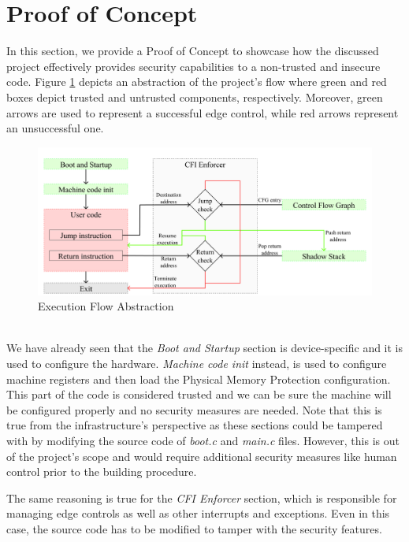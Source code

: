 \section{Proof of Concept}
\label{sec:project_poc}

In this section, we provide a Proof of Concept to showcase how the discussed
project effectively provides security capabilities to a non-trusted and insecure
code. Figure \ref{fig:functioning} depicts an abstraction of the project's flow where
green and red boxes depict trusted and untrusted components, respectively. Moreover,
green arrows are used to represent a successful edge control, while red arrows represent
an unsuccessful one. \\
\begin{figure}[htbp]
  \centering
  \includegraphics[width=.9\linewidth]{images/functioning.png}
  \caption{Execution Flow Abstraction}
  \label{fig:functioning}
\end{figure}
\\

We have already seen that the \textit{Boot and Startup} section is device-specific
and it is used to configure the hardware. \textit{Machine code init} instead, is
used to configure machine registers and then load the Physical Memory Protection
configuration. This part of the code is considered trusted and we can be sure
the machine will be configured properly and no security measures are needed. Note
that this is true from the infrastructure's perspective as these sections could be
tampered with by modifying the source code of \textit{boot.c} and \textit{main.c}
files. However, this is out of the project's scope and would require additional security
measures like human control prior to the building procedure.

The same reasoning is true for the \textit{CFI Enforcer} section, which is responsible
for managing edge controls as well as other interrupts and exceptions. Even in
this case, the source code has to be modified to tamper with the security features.

